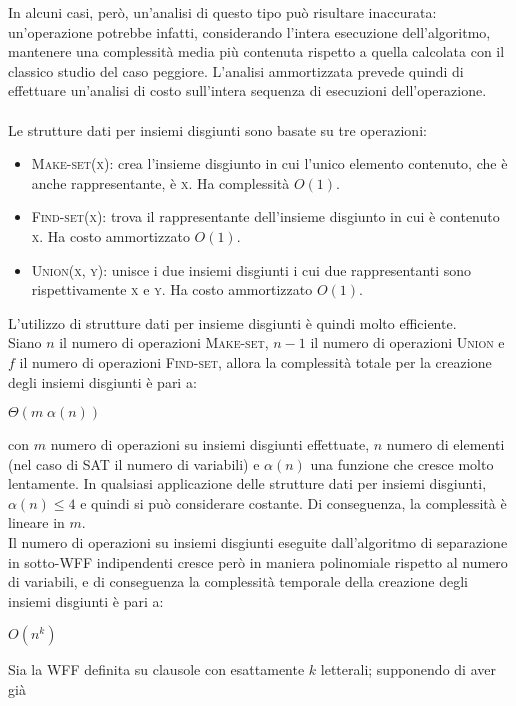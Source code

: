 In alcuni casi, però, un'analisi di questo tipo può risultare inaccurata: un'operazione potrebbe infatti, considerando l'intera esecuzione dell'algoritmo, mantenere una complessità media più contenuta rispetto a quella calcolata con il classico studio del caso peggiore.
L'analisi ammortizzata prevede quindi di effettuare un'analisi di costo sull'intera sequenza di esecuzioni dell'operazione.\\
\\
Le strutture dati per insiemi disgiunti sono basate su tre operazioni:
\begin{itemize}
    \item \textsc{Make-set(x)}: crea l'insieme disgiunto in cui l'unico elemento contenuto, che è anche rappresentante, è \textsc{x}. Ha complessità $O(1)$.
    \item \textsc{Find-set(x)}: trova il rappresentante dell'insieme disgiunto in cui è  contenuto \textsc{x}. Ha costo ammortizzato $O(1)$.
    \item \textsc{Union(x, y)}: unisce i due insiemi disgiunti i cui due rappresentanti sono rispettivamente \textsc{x} e \textsc{y}. Ha costo ammortizzato $O(1)$.
\end{itemize}
L'utilizzo di strutture dati per insieme disgiunti è quindi molto efficiente.\\
Siano $n$ il numero di operazioni \textsc{Make-set}, $n-1$ il numero di operazioni \textsc{Union} e $f$ il numero di operazioni \textsc{Find-set}, allora la complessità totale per la creazione degli insiemi disgiunti è pari a: 
\begin{center}
    $\Theta(m \; \alpha(n))$
\end{center}
con $m$ numero di operazioni su insiemi disgiunti effettuate, $n$ numero di elementi (nel caso di SAT il numero di variabili) e $\alpha(n)$ una funzione che cresce molto lentamente.
In qualsiasi applicazione delle strutture dati per insiemi disgiunti, $\alpha(n) \le 4$ e quindi si può considerare costante. Di conseguenza, la complessità è lineare in $m$.\\
Il numero di operazioni su insiemi disgiunti eseguite dall'algoritmo di separazione in sotto-WFF indipendenti cresce però in maniera polinomiale rispetto al numero di variabili, e di conseguenza la complessità temporale della creazione degli insiemi disgiunti è pari a:
\begin{center}
    $O(n^k)$
\end{center}
Sia la WFF definita su clausole con esattamente $k$ letterali; supponendo di aver già 
